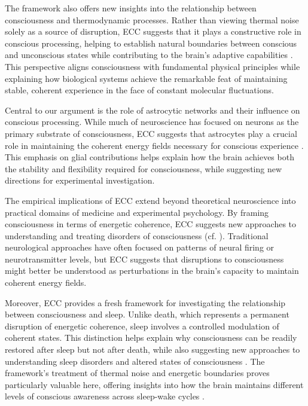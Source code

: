 The framework also offers new insights into the relationship between consciousness and thermodynamic processes. Rather than viewing thermal noise solely as a source of disruption, ECC suggests that it plays a constructive role in conscious processing, helping to establish natural boundaries between conscious and unconscious states while contributing to the brain's adaptive capabilities \cite{prigogine2018order}. This perspective aligns consciousness with fundamental physical principles while explaining how biological systems achieve the remarkable feat of maintaining stable, coherent experience in the face of constant molecular fluctuations.

Central to our argument is the role of astrocytic networks and their influence on conscious processing. While much of neuroscience has focused on neurons as the primary substrate of consciousness, ECC suggests that astrocytes play a crucial role in maintaining the coherent energy fields necessary for conscious experience \cite{Bazargani2016}. This emphasis on glial contributions helps explain how the brain achieves both the stability and flexibility required for consciousness, while suggesting new directions for experimental investigation.

The empirical implications of ECC extend beyond theoretical neuroscience into practical domains of medicine and experimental psychology. By framing consciousness in terms of energetic coherence, ECC suggests new approaches to understanding and treating disorders of consciousness (cf. \cite{tononi2015consciousness}). Traditional neurological approaches have often focused on patterns of neural firing or neurotransmitter levels, but ECC suggests that disruptions to consciousness might better be understood as perturbations in the brain's capacity to maintain coherent energy fields.

Moreover, ECC provides a fresh framework for investigating the relationship between consciousness and sleep. Unlike death, which represents a permanent disruption of energetic coherence, sleep involves a controlled modulation of coherent states. This distinction helps explain why consciousness can be readily restored after sleep but not after death, while also suggesting new approaches to understanding sleep disorders and altered states of consciousness \cite{Dittrich2010}. The framework's treatment of thermal noise and energetic boundaries proves particularly valuable here, offering insights into how the brain maintains different levels of conscious awareness across sleep-wake cycles \cite{prigogine2018order}.


